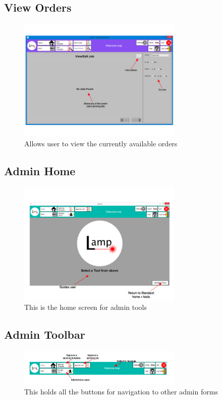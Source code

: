 \documentclass[oneside,openany,11pt,a4paper]{report}
\begin{document}
\subsection{View Orders}
\begin{figure}[H]
	\centering
	\includegraphics[width=0.7\textwidth]{screen/vieworders.png}
	\caption{Allows user to view the currently available orders}
\end{figure}

\subsection{Admin Home}
\begin{figure}[H]
	\centering
	\includegraphics[width=0.7\textwidth]{screen/adminhome.png}
	\caption{This is the home screen for admin tools}
\end{figure}

\subsection{Admin Toolbar}
\begin{figure}[H]
	\centering
	\includegraphics[width=0.7\textwidth]{screen/admintoolbar.png}
	\caption{This holds all the buttons for navigation to other admin forms}
\end{figure}
\end{document}
